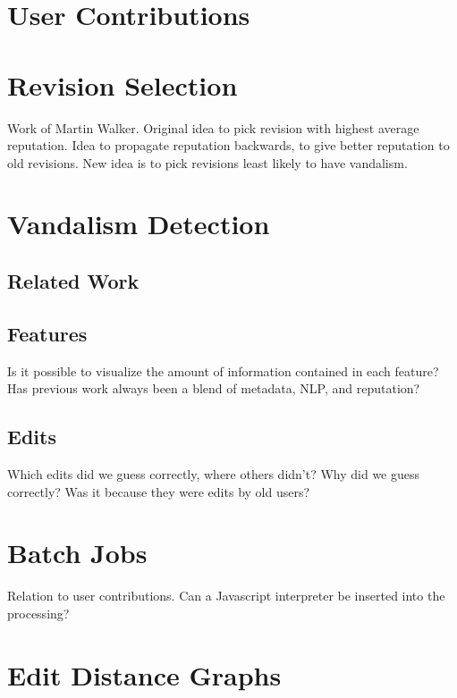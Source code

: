 \chapter{User Contributions}

\chapter{Revision Selection}
    Work of Martin Walker.
    Original idea to pick revision with highest average reputation.
    Idea to propagate reputation backwards, to give better reputation
    to old revisions.
    New idea is to pick revisions least likely to have vandalism.

\chapter{Vandalism Detection}
    \section{Related Work}

    \section{Features}
        Is it possible to visualize the amount of information
        contained in each feature?
        Has previous work always been a blend of metadata, NLP,
        and reputation?
    \section{Edits}
        Which edits did we guess correctly, where others didn't?
        Why did we guess correctly?  Was it because they were edits
        by old users?

\chapter{Batch Jobs}

    Relation to user contributions.
    Can a Javascript interpreter be inserted into the processing?

\chapter{Edit Distance Graphs}


